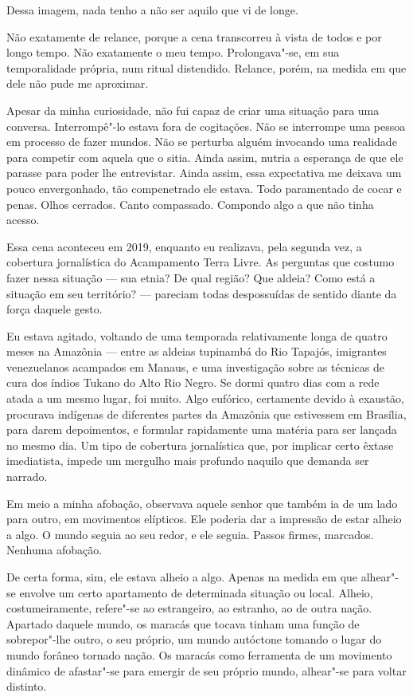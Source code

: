 Dessa imagem, nada tenho a não ser aquilo que vi de longe.

Não exatamente de relance, porque a cena transcorreu à vista de todos e
por longo tempo. Não exatamente o meu tempo. Prolongava"-se, em sua
temporalidade própria, num ritual distendido. Relance, porém, na medida
em que dele não pude me aproximar.

Apesar da minha curiosidade, não fui capaz de criar uma situação para
uma conversa. Interrompê"-lo estava fora de cogitações. Não se interrompe uma pessoa em processo de fazer
mundos. Não se perturba alguém invocando uma realidade para competir com
aquela que o sitia. Ainda assim, nutria a esperança de que ele parasse
para poder lhe entrevistar. Ainda assim, essa expectativa me deixava um
pouco envergonhado, tão compenetrado ele estava. Todo paramentado de
cocar e penas. Olhos cerrados. Canto compassado. Compondo algo a que não
tinha acesso.

Essa cena aconteceu em 2019, enquanto eu realizava, pela segunda vez, a cobertura
jornalística do Acampamento Terra Livre. As perguntas que costumo fazer nessa situação ---
sua etnia? De qual região? Que aldeia? Como está a situação em seu
território? --- pareciam todas despossuídas de sentido diante da força daquele
gesto.

Eu estava agitado, voltando de uma temporada relativamente longa de
quatro meses na Amazônia --- entre as aldeias tupinambá do Rio Tapajós,
imigrantes venezuelanos acampados em Manaus, e uma investigação sobre as
técnicas de cura dos índios Tukano do Alto Rio Negro. Se dormi quatro
dias com a rede atada a um mesmo lugar, foi muito. Algo eufórico,
certamente devido à exaustão, procurava indígenas de diferentes partes da
Amazônia que estivessem em Brasília, para darem depoimentos, e formular
rapidamente uma matéria para ser lançada no mesmo dia. Um tipo de
cobertura jornalística que, por implicar certo êxtase imediatista,
impede um mergulho mais profundo naquilo que demanda ser narrado.

Em meio a minha afobação, observava aquele
senhor que também ia de um lado para outro, em movimentos elípticos. Ele
poderia dar a impressão de estar alheio a algo. O mundo seguia ao seu
redor, e ele seguia. Passos firmes, marcados. Nenhuma afobação.

De certa forma, sim, ele estava alheio a algo. Apenas na medida em que
alhear"-se envolve um certo apartamento de determinada situação ou local.
Alheio, costumeiramente, refere"-se ao estrangeiro, ao estranho, ao de
outra nação. Apartado daquele mundo, os maracás que tocava tinham uma
função de sobrepor"-lhe outro, o seu próprio, um mundo autóctone tomando
o lugar do mundo forâneo tornado nação. Os maracás como ferramenta de um
movimento dinâmico de afastar"-se para emergir de seu próprio mundo,
alhear"-se para voltar distinto.

